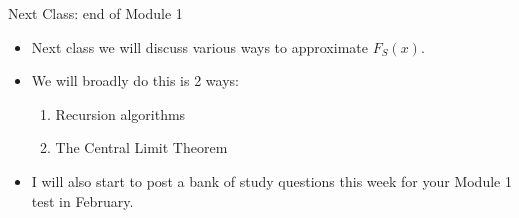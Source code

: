 \documentclass[11pt]{beamer}
\begin{document}
\begin{frame}{Next Class: end of Module 1 }



\begin{itemize}
\item Next class we will discuss various ways to approximate $F_S(x)$.
\vfill
\item We will broadly do this is 2 ways:
\begin{enumerate}
\item Recursion algorithms
\item The Central Limit Theorem
\end{enumerate}
\vfill
\item I will also start to post a bank of study questions this week for your Module 1 test in February. 

\end{itemize}


\end{frame}
\end{document}
